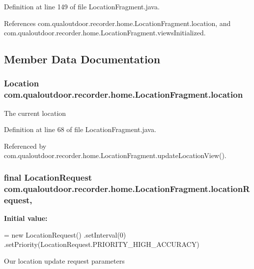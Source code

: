 Definition at line 149 of file Location\-Fragment.\-java.



References com.\-qualoutdoor.\-recorder.\-home.\-Location\-Fragment.\-location, and com.\-qualoutdoor.\-recorder.\-home.\-Location\-Fragment.\-views\-Initialized.



\subsection{Member Data Documentation}
\hypertarget{classcom_1_1qualoutdoor_1_1recorder_1_1home_1_1LocationFragment_a3dd24810ca51567a5c911196638ead94}{
\subsubsection[{location}]{\setlength{\rightskip}{0pt plus 5cm}Location com.\-qualoutdoor.\-recorder.\-home.\-Location\-Fragment.\-location\hspace{0.3cm}{\ttfamily [private]}}}\label{classcom_1_1qualoutdoor_1_1recorder_1_1home_1_1LocationFragment_a3dd24810ca51567a5c911196638ead94}
The current location 

Definition at line 68 of file Location\-Fragment.\-java.



Referenced by com.\-qualoutdoor.\-recorder.\-home.\-Location\-Fragment.\-update\-Location\-View().

\hypertarget{classcom_1_1qualoutdoor_1_1recorder_1_1home_1_1LocationFragment_af5fb1c9b499a730dbc82633e3ca9938f}{
\subsubsection[{location\-Request}]{\setlength{\rightskip}{0pt plus 5cm}final Location\-Request com.\-qualoutdoor.\-recorder.\-home.\-Location\-Fragment.\-location\-Request\hspace{0.3cm}{\ttfamily [static]}, {\ttfamily [private]}}}\label{classcom_1_1qualoutdoor_1_1recorder_1_1home_1_1LocationFragment_af5fb1c9b499a730dbc82633e3ca9938f}
{\bfseries Initial value\-:}
\begin{DoxyCode}
= \textcolor{keyword}{new} LocationRequest()
            .setInterval(0) 
            .setPriority(LocationRequest.PRIORITY\_HIGH\_ACCURACY)
\end{DoxyCode}
Our location update request parameters 


